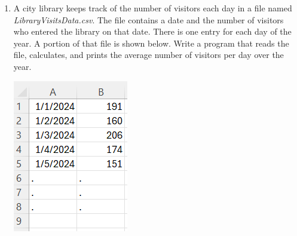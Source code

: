 \documentclass{article}
\begin{document}
\begin{enumerate}
	\item 
		A city library keeps track of the number of visitors each day in a file named \textit{LibraryVisitsData.csv}.  
		The file contains a date and the number of visitors who entered the library on that date.  
		There is one entry for each day of the year. A portion of that file is shown below.  
		Write a program that reads the file, calculates, and prints the average number of visitors per day over the year.
		
		\begin{flushright}
			\includegraphics[scale=.65]{imgs/LibraryVisitsData.PNG}
		\end{flushright}



\end{enumerate}
\end{document}
